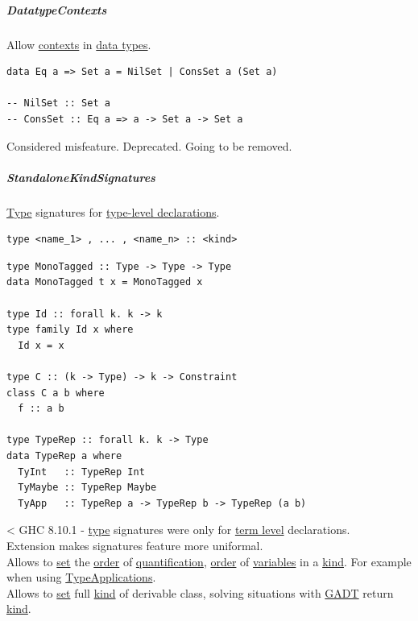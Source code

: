 \documentclass[11pt]{article}
\begin{document}
\subparagraph{\label{orgffd0548}DatatypeContexts}
\label{sec:org40cffe2}
Allow \hyperref[orgfad9713]{contexts} in \hyperref[org88981ee]{data types}.\\
\begin{verbatim}
data Eq a => Set a = NilSet | ConsSet a (Set a)

-- NilSet :: Set a
-- ConsSet :: Eq a => a -> Set a -> Set a
\end{verbatim}
Considered misfeature. Deprecated. Going to be removed.\\

\subparagraph{\label{org1350b70}StandaloneKindSignatures}
\label{sec:orgf8835d4}
\hyperref[org4fbaeb8]{Type} signatures for \hyperref[orgfc6c0b5]{type-level declarations}.\\

\begin{verbatim}
type <name_1> , ... , <name_n> :: <kind>
\end{verbatim}

\begin{verbatim}
type MonoTagged :: Type -> Type -> Type
data MonoTagged t x = MonoTagged x

type Id :: forall k. k -> k
type family Id x where
  Id x = x

type C :: (k -> Type) -> k -> Constraint
class C a b where
  f :: a b

type TypeRep :: forall k. k -> Type
data TypeRep a where
  TyInt   :: TypeRep Int
  TyMaybe :: TypeRep Maybe
  TyApp   :: TypeRep a -> TypeRep b -> TypeRep (a b)
\end{verbatim}

< GHC 8.10.1 - \hyperref[org4fbaeb8]{type} signatures were only for \hyperref[org3e856cf]{term level} declarations.\\

Extension makes signatures feature more uniformal.\\

Allows to \hyperref[orgbed80ba]{set} the \hyperref[org8544276]{order} of \hyperref[org0e370df]{quantification}, \hyperref[org8544276]{order} of \hyperref[orgd3f3ade]{variables} in a \hyperref[org19ec4cb]{kind}. For example when using \hyperref[orgc6a3716]{TypeApplications}.\\

Allows to \hyperref[orgbed80ba]{set} full \hyperref[org19ec4cb]{kind} of derivable class, solving situations with \hyperref[orgaf2367e]{GADT} return \hyperref[org19ec4cb]{kind}.\\
\end{document}
